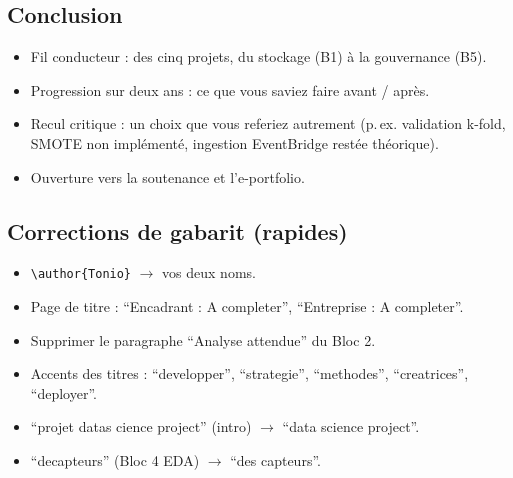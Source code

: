 \documentclass[11pt,a4paper]{article}
\begin{document}
\subsection*{Conclusion}
\begin{itemize}[leftmargin=1.3em]
  \item Fil conducteur : des cinq projets, du stockage (B1) à la gouvernance (B5).
  \item Progression sur deux ans : ce que vous saviez faire avant / après.
  \item Recul critique : un choix que vous referiez autrement (p.\,ex. validation k-fold,
  SMOTE non implémenté, ingestion EventBridge restée théorique).
  \item Ouverture vers la soutenance et l'e-portfolio.
\end{itemize}

\subsection*{Corrections de gabarit (rapides)}
\begin{itemize}[leftmargin=1.3em]
  \item \texttt{\textbackslash author\{Tonio\}} $\rightarrow$ vos deux noms.
  \item Page de titre : \enquote{Encadrant : A completer}, \enquote{Entreprise : A completer}.
  \item Supprimer le paragraphe \enquote{Analyse attendue} du Bloc 2.
  \item Accents des titres : \enquote{developper}, \enquote{strategie}, \enquote{methodes},
  \enquote{creatrices}, \enquote{deployer}.
  \item \enquote{projet datas cience project} (intro) $\rightarrow$ \enquote{data science project}.
  \item \enquote{decapteurs} (Bloc 4 EDA) $\rightarrow$ \enquote{des capteurs}.
\end{itemize}
\end{document}
